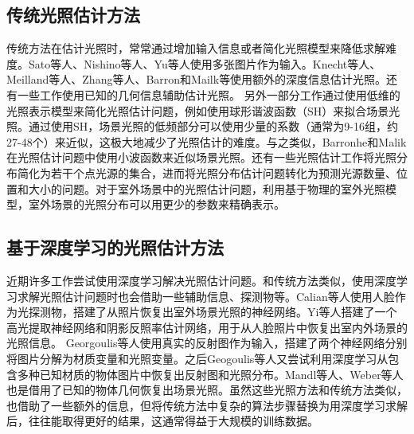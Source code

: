 \subsection{传统光照估计方法}
传统方法在估计光照时，常常通过增加输入信息或者简化光照模型来降低求解难度。Sato等人\cite{sato1999acquiring}、Nishino\cite{nishino2001determining}等人、Yu\cite{yu2006sparse}等人使用多张图片作为输入。Knecht\cite{knecht2012reciprocal}等人、Meilland\cite{meilland20133d}等人、Zhang等人\cite{zhang2016emptying}、Barron和Mailk\cite{barron2013intrinsic}等使用额外的深度信息估计光照。还有一些工作使用已知的几何信息辅助估计光照\cite{ramamoorthi2001signal, sato2003illumination, li2003multiple}。
另外一部分工作通过使用低维的光照表示模型来简化光照估计问题，例如使用球形谐波函数（SH）来拟合场景光照\cite{ramamoorthi2001signal,kemelmacher20113d,garrido2013reconstructing,
knorr2014real,li2014intrinsic,barron2015shape, rematas2016deep}。通过使用SH，场景光照的低频部分可以使用少量的系数（通常为9-16组，约27-48个）来近似，这极大地减少了光照估计的难度。与之类似，Barronhe和Malik\cite{okabe2004spherical}在光照估计问题中使用小波函数来近似场景光照。还有一些光照估计工作\cite{sato1999acquiring,  panagopoulos2011illumination, wang2002estimation, li2003multiple, sato2003illumination}将光照分布简化为若干个点光源的集合，进而将光照分布估计问题转化为预测光源数量、位置和大小的问题。对于室外场景中的光照估计问题，利用基于物理的室外光照模型\cite{lalonde2008does, lalonde2010sun, lalonde2012estimating, sunkavalli2008color}，室外场景的光照分布可以用更少的参数来精确表示。
\subsection{基于深度学习的光照估计方法}

近期许多工作尝试使用深度学习解决光照估计问题。和传统方法类似，使用深度学习求解光照估计问题时也会借助一些辅助信息、探测物等。Calian等人\cite{calian2018faces}使用人脸作为光探测物，搭建了从照片恢复出室外场景光照的神经网络。Yi等人\cite{yi2018faces}搭建了一个高光提取神经网络和阴影反照率估计网络，用于从人脸照片中恢复出室内外场景的光照信息。
Georgoulis等人\cite{georgoulis2016delight}使用真实的反射图作为输入，搭建了两个神经网络分别将图片分解为材质变量和光照变量。之后Geogoulis等人\cite{georgoulis2016natural}又尝试利用深度学习从包含多种已知材质的物体图片中恢复出反射图和光照分布。Mandl等人\cite{mandl2017learning}、Weber等人\cite{weber2018learning}也是借用了已知的物体几何恢复出场景光照。虽然这些光照方法和传统方法类似，也借助了一些额外的信息，但将传统方法中复杂的算法步骤替换为用深度学习求解后，往往能取得更好的结果，这通常得益于大规模的训练数据。

